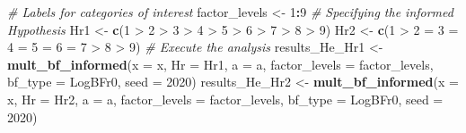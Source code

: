 \documentclass[
  english,
  man,floatsintext]{apa6}
\newenvironment{Shaded}{\begin{snugshade}}{\end{snugshade}}
\newcommand{\CommentTok}[1]{\textcolor[rgb]{0.56,0.35,0.01}{\textit{#1}}}
\newcommand{\DataTypeTok}[1]{\textcolor[rgb]{0.13,0.29,0.53}{#1}}
\newcommand{\DecValTok}[1]{\textcolor[rgb]{0.00,0.00,0.81}{#1}}
\newcommand{\KeywordTok}[1]{\textcolor[rgb]{0.13,0.29,0.53}{\textbf{#1}}}
\newcommand{\NormalTok}[1]{#1}
\newcommand{\OperatorTok}[1]{\textcolor[rgb]{0.81,0.36,0.00}{\textbf{#1}}}
\newcommand{\StringTok}[1]{\textcolor[rgb]{0.31,0.60,0.02}{#1}}
\begin{document}
\begin{Shaded}
\begin{Highlighting}[]
\CommentTok{\# Labels for categories of interest}
\NormalTok{factor\_levels \textless{}{-}}\StringTok{ }\DecValTok{1}\OperatorTok{:}\DecValTok{9}
\CommentTok{\# Specifying the informed Hypothesis}
\NormalTok{Hr1 \textless{}{-}}\StringTok{ }\KeywordTok{c}\NormalTok{(}\StringTok{\textquotesingle{}1 \textgreater{} 2 \textgreater{} 3 \textgreater{} 4 \textgreater{} 5 \textgreater{} 6 \textgreater{} 7 \textgreater{} 8 \textgreater{} 9\textquotesingle{}}\NormalTok{)}
\NormalTok{Hr2 \textless{}{-}}\StringTok{ }\KeywordTok{c}\NormalTok{(}\StringTok{\textquotesingle{}1 \textgreater{} 2 = 3 = 4 = 5 = 6 = 7 \textgreater{} 8 \textgreater{} 9\textquotesingle{}}\NormalTok{)}
\CommentTok{\# Execute the analysis}
\NormalTok{results\_He\_Hr1 \textless{}{-}}\StringTok{ }\KeywordTok{mult\_bf\_informed}\NormalTok{(}\DataTypeTok{x =}\NormalTok{ x, }\DataTypeTok{Hr =}\NormalTok{ Hr1, }\DataTypeTok{a =}\NormalTok{ a, }
                                 \DataTypeTok{factor\_levels =}\NormalTok{ factor\_levels, }
                                 \DataTypeTok{bf\_type =} \StringTok{\textquotesingle{}LogBFr0\textquotesingle{}}\NormalTok{, }\DataTypeTok{seed =} \DecValTok{2020}\NormalTok{)}
\NormalTok{results\_He\_Hr2 \textless{}{-}}\StringTok{ }\KeywordTok{mult\_bf\_informed}\NormalTok{(}\DataTypeTok{x =}\NormalTok{ x, }\DataTypeTok{Hr =}\NormalTok{ Hr2, }\DataTypeTok{a =}\NormalTok{ a, }
                                 \DataTypeTok{factor\_levels =}\NormalTok{ factor\_levels, }
                                 \DataTypeTok{bf\_type =} \StringTok{\textquotesingle{}LogBFr0\textquotesingle{}}\NormalTok{, }\DataTypeTok{seed =} \DecValTok{2020}\NormalTok{)}
\end{Highlighting}
\end{Shaded}

\begin{Shaded}
\end{Shaded}
\end{document}
